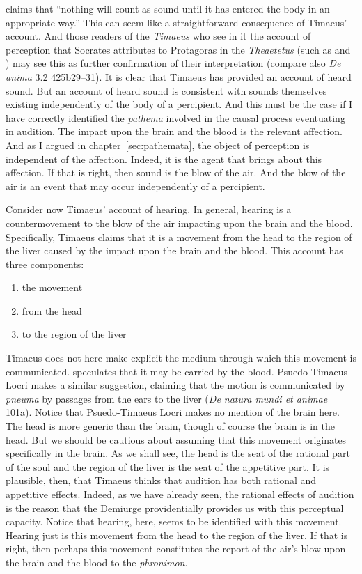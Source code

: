 \citet[86]{Barker:2000dy} claims that ``nothing will count as sound until it has entered the body in an appropriate way.'' This can seem like a straightforward consequence of Timaeus' account. And those readers of the \emph{Timaeus} who see in it the account of perception that Socrates attributes to Protagoras in the \emph{Theaetetus} (such as \citealt{Cornford:1935fk} and \citealt{Kahn:2013ob}) may see this as further confirmation of their interpretation (compare also \emph{De anima} 3.2 425b29--31). It is clear that Timaeus has provided an account of heard sound. But an account of heard sound is consistent with sounds themselves existing independently of the body of a percipient. And this must be the case if I have correctly identified the \emph{pathēma} involved in the causal process eventuating in audition. The impact upon the brain and the blood is the relevant affection. And as I argued in chapter~\ref{sec:pathemata}, the object of perception is independent of the affection. Indeed, it is the agent that brings about this affection. If that is right, then sound is the blow of the air. And the blow of the air is an event that may occur independently of a percipient.

Consider now Timaeus' account of hearing. In general, hearing is a countermovement to the blow of the air impacting upon the brain and the blood. Specifically, Timaeus claims that it is a movement from the head to the region of the liver caused by the impact upon the brain and the blood. This account has three components:
\begin{enumerate}[(1)]
	\item the movement
	\item from the head
	\item to the region of the liver
\end{enumerate}
Timaeus does not here make explicit the medium through which this movement is communicated. \citealt[477]{Taylor:1928qb} speculates that it may be carried by the blood. Psuedo-Timaeus Locri makes a similar suggestion, claiming that the motion is communicated by \emph{pneuma} by passages from the ears to the liver (\emph{De natura mundi et animae} 101a). Notice that Psuedo-Timaeus Locri makes no mention of the brain here. The head is more generic than the brain, though of course the brain is in the head. But we should be cautious about assuming that this movement originates specifically in the brain. As we shall see, the head is the seat of the rational part of the soul and the region of the liver is the seat of the appetitive part. It is plausible, then, that Timaeus thinks that audition has both rational and appetitive effects. Indeed, as we have already seen, the rational effects of audition is the reason that the Demiurge providentially provides us with this perceptual capacity. Notice that hearing, here, seems to be identified with this movement. Hearing just is this movement from the head to the region of the liver. If that is right, then perhaps this movement constitutes the report of the air's blow upon the brain and the blood to the \emph{phronimon}.


